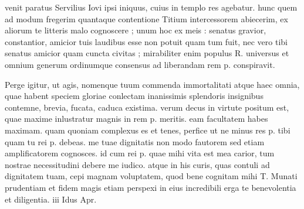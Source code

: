  venit paratus Servilius Iovi ipsi iniquus, cuius in templo res agebatur. hunc quem ad modum fregerim quantaque contentione Titium intercessorem abiecerim, ex aliorum te litteris malo cognoscere ; unum hoc ex meis : senatus gravior, constantior, amicior tuis laudibus esse non potuit quam tum fuit, nec vero tibi senatus amicior quam cuncta civitas ; mirabiliter enim populus R. universus et omnium generum ordinumque consensus ad liberandam rem p. conspiravit.

 Perge igitur, ut agis, nomenque tuum commenda immortalitati atque haec omnia, quae habent speciem gloriae conlectam inanissimis splendoris insignibus contemne, brevia, fucata, caduca existima. verum decus in virtute positum est, quae maxime inlustratur magnis in rem p. meritis. eam facultatem habes maximam. quam quoniam complexus es et tenes, perfice ut ne minus res p. tibi quam tu rei p. debeas. me tuae dignitatis non modo fautorem sed etiam amplificatorem cognosces. id cum rei p. quae mihi vita est mea carior, tum nostrae necessitudini debere me iudico. atque in his curis, quas contuli ad dignitatem tuam, cepi magnam voluptatem, quod bene cognitam mihi T. Munati prudentiam et fidem magis etiam perspexi in eius incredibili erga te benevolentia et diligentia. iii Idus Apr.

